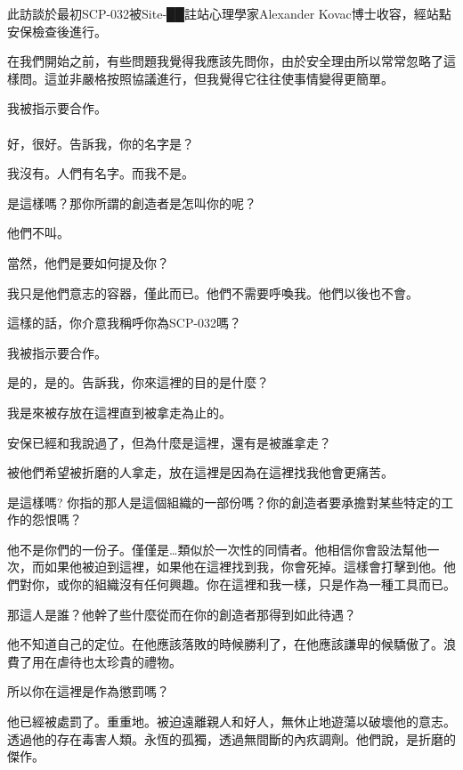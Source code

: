 \begin{scpbox}

此訪談於最初SCP-032被Site-██註站心理學家Alexander Kovac博士收容，經站點安保檢查後進行。


在我們開始之前，有些問題我覺得我應該先問你，由於安全理由所以常常忽略了這樣問。這並非嚴格按照協議進行，但我覺得它往往使事情變得更簡單。

我被指示要合作。\\
\\
好，很好。告訴我，你的名字是？

我沒有。人們有名字。而我不是。

是這樣嗎？那你所謂的創造者是怎叫你的呢？

他們不叫。

當然，他們是要如何提及你？

我只是他們意志的容器，僅此而已。他們不需要呼喚我。他們以後也不會。

這樣的話，你介意我稱呼你為SCP-032嗎？

我被指示要合作。

是的，是的。告訴我，你來這裡的目的是什麼？

我是來被存放在這裡直到被拿走為止的。

安保已經和我說過了，但為什麼是這裡，還有是被誰拿走？

被他們希望被折磨的人拿走，放在這裡是因為在這裡找我他會更痛苦。

是這樣嗎? 你指的那人是這個組織的一部份嗎？你的創造者要承擔對某些特定的工作的怨恨嗎？

他不是你們的一份子。僅僅是…類似於一次性的同情者。他相信你會設法幫他一次，而如果他被迫到這裡，如果他在這裡找到我，你會死掉。這樣會打擊到他。他們對你，或你的組織沒有任何興趣。你在這裡和我一樣，只是作為一種工具而已。

那這人是誰？他幹了些什麼從而在你的創造者那得到如此待遇？

他不知道自己的定位。在他應該落敗的時候勝利了，在他應該謙卑的候驕傲了。浪費了用在虐待也太珍貴的禮物。

所以你在這裡是作為懲罰嗎？

他已經被處罰了。重重地。被迫遠離親人和好人，無休止地遊蕩以破壞他的意志。透過他的存在毒害人類。永恆的孤獨，透過無間斷的內疚調劑。他們說，是折磨的傑作。


\end{scpbox}
